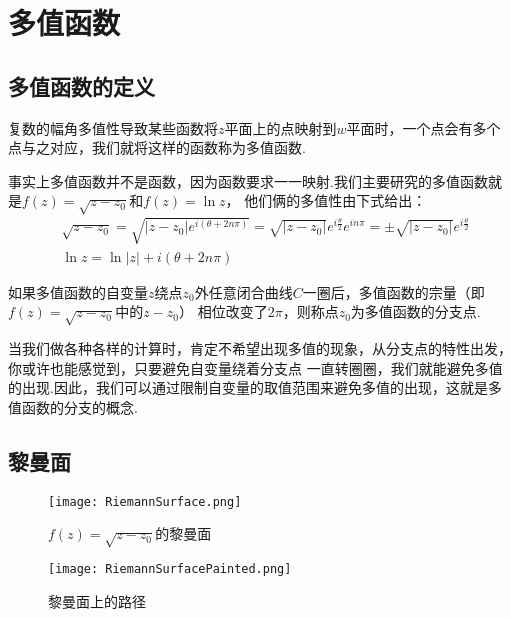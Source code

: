 \section{多值函数}

    \subsection{多值函数的定义}
        \allowdisplaybreaks
        \begin{definition}[多值函数]\label{def:multi_value_function}
            复数的幅角多值性导致某些函数将$z$平面上的点映射到$w$平面时，一个点会有多个点与之对应，我们就将这样的函数称为多值函数.
        \end{definition}

        事实上多值函数并不是函数，因为函数要求一一映射.我们主要研究的多值函数就是$f(z) = \sqrt{z - z_0}$和$f(z) = \ln{z}$，
        他们俩的多值性由下式给出：
        \begin{align}
            \label{eq:multi_value_function}
            &\sqrt{z - z_0} = \sqrt{|z - z_0|e^{i(\theta + 2n\pi)}} = \sqrt{|z - z_0|}e^{i\frac{\theta}{2}}e^{in\pi} = \pm \sqrt{|z - z_0|}e^{i\frac{\theta}{2}}\\
            &\ln{z} = \ln{|z|} + i(\theta + 2n\pi)
        \end{align}

        \begin{definition}[分支点（枝点）]\label{def:branch_point}
            如果多值函数的自变量$z$绕点$z_0$外任意闭合曲线$C$一圈后，多值函数的宗量（即$f(z) = \sqrt{z - z_0}$中的$z - z_0$）
            相位改变了$2\pi$，则称点$z_0$为多值函数的分支点.
        \end{definition}

        当我们做各种各样的计算时，肯定不希望出现多值的现象，从分支点的特性出发，你或许也能感觉到，只要避免自变量绕着分支点
        一直转圈圈，我们就能避免多值的出现.因此，我们可以通过限制自变量的取值范围来避免多值的出现，这就是多值函数的分支的概念.

    \subsection{黎曼面}
        \begin{figure}[htbp]
            \centering
            \begin{minipage}[t]{0.48\textwidth}
                \centering
                \texttt{[image: RiemannSurface.png]}
                \caption{$f(z) = \sqrt{z - z_0}$的黎曼面}
                \label{fig:riemann_surface}
            \end{minipage}
            \begin{minipage}[t]{0.48\textwidth}
                \centering
                \texttt{[image: RiemannSurfacePainted.png]}
                \caption{黎曼面上的路径}
                \label{fig:riemann_surface_painted}
            \end{minipage}
        \end{figure}

